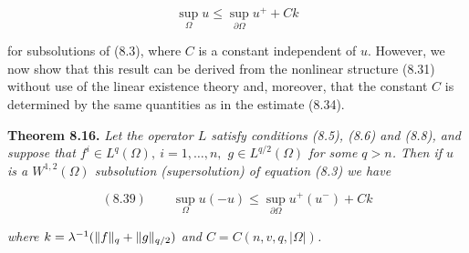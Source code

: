 \vspace{0.5em}

\[
\sup_{\Omega} u\leq \sup_{\partial\Omega} u^{+}+Ck
\]

\vspace{0.5em}

for subsolutions of (8.3), where $C$ is a constant independent of $u$. However, we now
show that this result can be derived from the nonlinear structure (8.31) without
use of the linear existence theory and, moreover, that the constant $C$ is determined
by the same quantities as in the estimate (8.34).

\vspace{1.5em}

\noindent\textbf{Theorem 8.16.} \textit{Let the operator $L$ satisfy conditions (8.5), (8.6) and (8.8), and
suppose that $f^{i}\in L^{q}(\Omega),\ i=1,\ldots,n,$ $g\in L^{q/2}(\Omega)$ for some $q>n$. Then if $u$ is a
$W^{1,2}(\Omega)$ subsolution (supersolution) of equation (8.3) we have}

\vspace{0.5em}

\[
(8.39)\qquad \sup_{\Omega} u(-u)\leq \sup_{\partial\Omega} u^{+}(u^{-})+Ck
\]

\vspace{0.5em}

\textit{where $k=\lambda^{-1}(\lVert f\rVert_{q}+\lVert g\rVert_{q/2})$ and $C=C(n,v,q,|\Omega|)$.}


